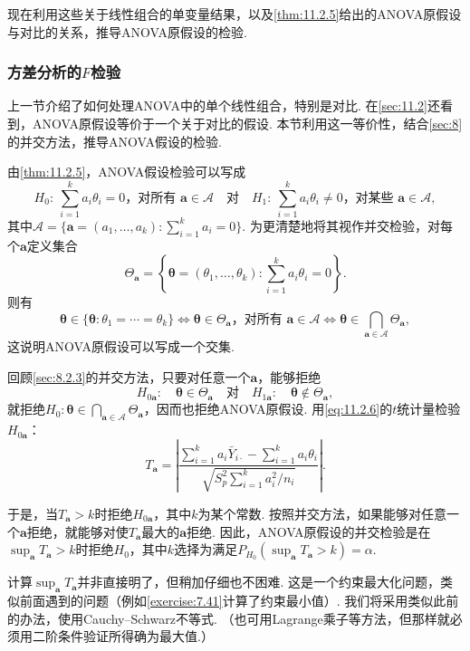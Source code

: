 现在利用这些关于线性组合的单变量结果，以及\autoref{thm:11.2.5}给出的ANOVA原假设与对比的关系，推导ANOVA原假设的检验.

\subsubsection{方差分析的\texorpdfstring{$F$}{F}检验}\label{sec:11.2.4}
上一节介绍了如何处理ANOVA中的单个线性组合，特别是对比. 在\autoref{sec:11.2}还看到，ANOVA原假设等价于一个关于对比的假设. 本节利用这一等价性，结合\autoref{sec:8}的并交方法，推导ANOVA假设的检验.

由\autoref{thm:11.2.5}，ANOVA假设检验可以写成
$$
H_0:\ \sum_{i=1}^ka_i\theta_i=0\text{，对所有 }\boldsymbol a\in\mathcal A
\quad\text{对}\quad
H_1:\ \sum_{i=1}^ka_i\theta_i\ne0\text{，对某些 }\boldsymbol a\in\mathcal A,
$$
其中$\mathcal A=\{\boldsymbol a=(a_1,\ldots,a_k):\sum_{i=1}^ka_i=0\}$. 为更清楚地将其视作并交检验，对每个$\boldsymbol a$定义集合
$$\Theta_{\boldsymbol a}=\left\{\boldsymbol\theta=(\theta_1,\ldots,\theta_k):\sum_{i=1}^ka_i\theta_i=0\right\}.$$
则有
$$\boldsymbol\theta\in\{\boldsymbol\theta:\theta_1=\cdots=\theta_k\}
\Longleftrightarrow\boldsymbol\theta\in\Theta_{\boldsymbol a}\text{，对所有 }\boldsymbol a\in\mathcal A
\Longleftrightarrow\boldsymbol\theta\in\bigcap_{\boldsymbol a\in\mathcal A}\Theta_{\boldsymbol a},$$
这说明ANOVA原假设可以写成一个交集.

回顾\autoref{sec:8.2.3}的并交方法，只要对任意一个$\boldsymbol a$，能够拒绝
$$H_{0\boldsymbol a}:\quad\boldsymbol\theta\in\Theta_{\boldsymbol a}
\quad\text{对}\quad H_{1\boldsymbol a}:\quad\boldsymbol\theta\notin\Theta_{\boldsymbol a},$$
就拒绝$H_0:\boldsymbol\theta\in\bigcap_{\boldsymbol a\in\mathcal A}\Theta_{\boldsymbol a}$，因而也拒绝ANOVA原假设. 用\eqref{eq:11.2.6}的$t$统计量检验$H_{0\boldsymbol a}$：
\begin{equation}\label{eq:11.2.9}
T_{\boldsymbol a}=\left|\frac{\sum_{i=1}^ka_i\bar Y_{i\cdot}-\sum_{i=1}^ka_i\theta_i}
{\sqrt{S_p^2\sum_{i=1}^ka_i^2/n_i}}\right|.
\end{equation}

于是，当$T_{\boldsymbol a}>k$时拒绝$H_{0\boldsymbol a}$，其中$k$为某个常数. 按照并交方法，如果能够对任意一个$\boldsymbol a$拒绝，就能够对使$T_{\boldsymbol a}$最大的$\boldsymbol a$拒绝. 因此，ANOVA原假设的并交检验是在$\sup_{\boldsymbol a}T_{\boldsymbol a}>k$时拒绝$H_0$，其中$k$选择为满足$P_{H_0}(\sup_{\boldsymbol a}T_{\boldsymbol a}>k)=\alpha$.

计算$\sup_{\boldsymbol a}T_{\boldsymbol a}$并非直接明了，但稍加仔细也不困难. 这是一个约束最大化问题，类似前面遇到的问题（例如\autoref{exercise:7.41}计算了约束最小值）. 我们将采用类似此前的办法，使用Cauchy--Schwarz不等式. （也可用Lagrange乘子等方法，但那样就必须用二阶条件验证所得确为最大值.）

